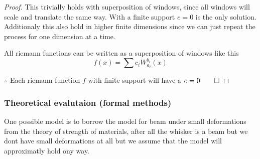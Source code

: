 \begin{proof}
  This trivially holds with superposition of windows, since all
  windows will scale and translate the same way.  With a finite
  support $e=0$ is the only solution. Additionaly this also hold in
  higher finite dimensions since we can just repeat the process for
  one dimension at a time.
    
  All riemann functions can be written as a superposition of windows
  like this
  \begin{equation}
    f(x)=\sum{c_iW_{a_i}^{b_i}(x)}
  \end{equation}
  
  $\therefore$ Each riemann function $f$ with finite support will have a $e=0\qed$
  
\end{proof}

\subsubsection{ Theoretical evalutaion (formal methods)}

One possible model is to borrow the model for beam under small
deformations from the theory of strength of materials, after all the
whisker is a beam but we dont have small deformations at all but we
assume that the model will approximatly hold ony way.


